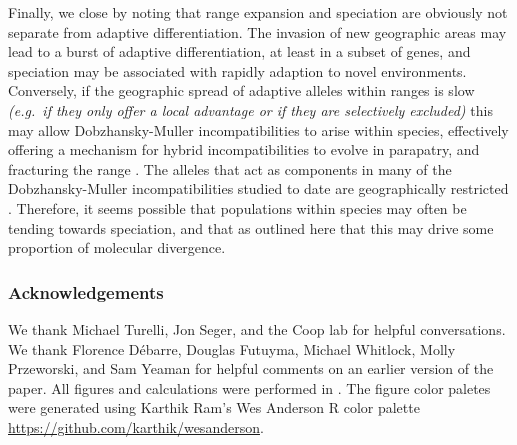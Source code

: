 \documentclass{article}
\newcommand{\mfp}[1]{{\it\color{red} #1} }
\begin{document}
Finally, we close by noting that range expansion and speciation 
are obviously not separate from adaptive differentiation. 
The invasion of new geographic areas may lead to a burst of adaptive differentiation, 
at least in a subset of genes, and speciation may be associated with rapidly adaption to novel environments. 
Conversely, if the geographic spread of adaptive alleles within ranges is slow 
\mfp{(e.g.\ if they only offer a local advantage or if they are selectively excluded)} 
this may allow Dobzhansky-Muller incompatibilities to arise within species, 
effectively offering a mechanism for hybrid incompatibilities to evolve in parapatry,
and fracturing the range \citep{Bank:12,Kondrashov:03,bierne2011coupling}. 
The alleles that act as components in many of the Dobzhansky-Muller incompatibilities studied to date 
are geographically restricted \citep[see][]{Cutter:12}. 
Therefore, it seems possible that populations within species may often be tending towards speciation, 
and that as outlined here that this may drive some proportion of molecular divergence.

\subsubsection*{Acknowledgements}
We thank Michael Turelli, Jon Seger, and the Coop lab for helpful
conversations. We thank Florence D\'ebarre, Douglas Futuyma, Michael   %
Whitlock, Molly Przeworski, and  Sam Yeaman for helpful comments on an
earlier version of the paper. All figures and calculations were
performed in \citet{R_stats}. The figure color paletes were generated using
Karthik Ram's Wes Anderson R color palette \url{https://github.com/karthik/wesanderson}.




\end{document}

